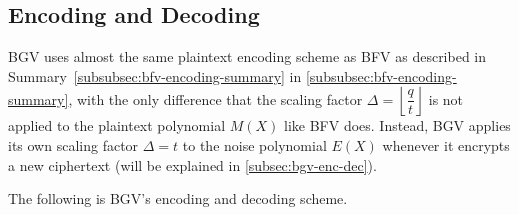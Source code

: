 \clearpage

\subsection{Encoding and Decoding}
\label{subsec:bgv-encoding-decoding}

BGV uses almost the same plaintext encoding scheme as BFV as described in Summary~\ref{subsubsec:bfv-encoding-summary} in \autoref{subsubsec:bfv-encoding-summary}, with the only difference that the scaling factor $\Delta = \left\lfloor\dfrac{q}{t}\right\rfloor$ is not applied to the plaintext polynomial $M(X)$ like BFV does. Instead, BGV applies its own scaling factor $\Delta = t$ to the noise polynomial $E(X)$ whenever it encrypts a new ciphertext (will be explained in \autoref{subsec:bgv-enc-dec}).

The following is BGV's encoding and decoding scheme.

